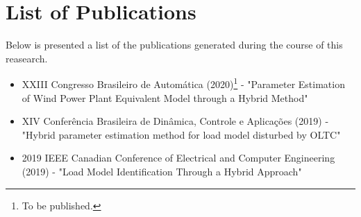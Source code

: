 \chapter{List of Publications}
\label{ch: Publications}

Below is presented a list of the publications generated during the course of this reasearch.

\begin{itemize}
	\item XXIII Congresso Brasileiro de Autom\'atica (2020)\footnote{To be published.} - "Parameter Estimation of Wind Power Plant Equivalent Model through a Hybrid Method"
	\item XIV Conferência Brasileira de Dinâmica, Controle e Aplicações (2019) - "Hybrid parameter estimation method for load model disturbed by OLTC"
	\item 2019 IEEE Canadian Conference of Electrical and Computer Engineering (2019) - "Load Model Identification Through a Hybrid Approach"
\end{itemize}